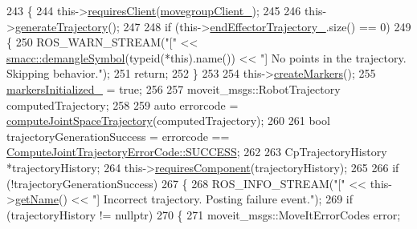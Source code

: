 \begin{DoxyCode}
243     \{
244         this->\hyperlink{classsmacc_1_1ISmaccClientBehavior_a32b16e99e3b4cb289414203dc861a440}{requiresClient}(\hyperlink{classcl__move__group__interface_1_1CbMoveEndEffectorTrajectory_aea650d3e7836125b32be97392b71a7f3}{movegroupClient\_});
245 
246         this->\hyperlink{classcl__move__group__interface_1_1CbMoveEndEffectorTrajectory_aeae938ab66e18ab7d2fb2427bc83647b}{generateTrajectory}();
247 
248         \textcolor{keywordflow}{if} (this->\hyperlink{classcl__move__group__interface_1_1CbMoveEndEffectorTrajectory_ae13dfd31ea3660646e03882f0c2c29f0}{endEffectorTrajectory\_}.size() == 0)
249         \{
250             ROS\_WARN\_STREAM(\textcolor{stringliteral}{"["} << \hyperlink{namespacesmacc_1_1introspection_a2f495108db3e57604d8d3ff5ef030302}{smacc::demangleSymbol}(\textcolor{keyword}{typeid}(*this).name()) << \textcolor{stringliteral}{"]
       No points in the trajectory. Skipping behavior."});
251             \textcolor{keywordflow}{return};
252         \}
253 
254         this->\hyperlink{classcl__move__group__interface_1_1CbMoveEndEffectorTrajectory_a442efa1d5bc9e9a16f74ecd31b13d9b5}{createMarkers}();
255         \hyperlink{classcl__move__group__interface_1_1CbMoveEndEffectorTrajectory_ac140a7f0adfb20f1e2900a5c8cd2ca5b}{markersInitialized\_} = \textcolor{keyword}{true};
256 
257         moveit\_msgs::RobotTrajectory computedTrajectory;
258 
259         \textcolor{keyword}{auto} errorcode = \hyperlink{classcl__move__group__interface_1_1CbMoveEndEffectorTrajectory_a485057c052729edd3e8303440b7ada66}{computeJointSpaceTrajectory}(computedTrajectory);
260 
261         \textcolor{keywordtype}{bool} trajectoryGenerationSuccess = errorcode == 
      \hyperlink{namespacecl__move__group__interface_ae5fc1caf9a16ae5ad1c97c2e137a7017ad0749aaba8b833466dfcbb0428e4f89c}{ComputeJointTrajectoryErrorCode::SUCCESS};
262 
263         CpTrajectoryHistory *trajectoryHistory;
264         this->\hyperlink{classsmacc_1_1ISmaccClientBehavior_a19c6d658c8e809bb93bfdc9b639a3ac3}{requiresComponent}(trajectoryHistory);
265 
266         \textcolor{keywordflow}{if} (!trajectoryGenerationSuccess)
267         \{
268             ROS\_INFO\_STREAM(\textcolor{stringliteral}{"["} << this->\hyperlink{classsmacc_1_1ISmaccClientBehavior_a18e4bec9460b010f2894c0f7e7064a34}{getName}() << \textcolor{stringliteral}{"] Incorrect trajectory. Posting failure
       event."});
269             \textcolor{keywordflow}{if} (trajectoryHistory != \textcolor{keyword}{nullptr})
270             \{
271                 moveit\_msgs::MoveItErrorCodes error;

\end{DoxyCode}

